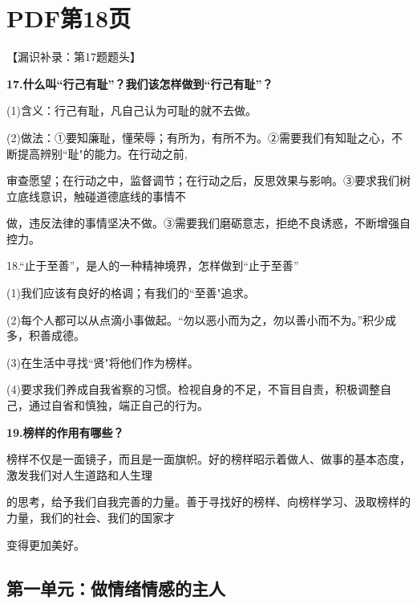 \documentclass[lang=cn,11pt]{elegantbook}
\newcommand{\daofasym}[1]{{\daofasymbolfont #1}}
\newcommand{\daofasym}[1]{#1}
\begin{document}
\section*{PDF第18页}

【漏识补录：第17题题头】\par

\textbf{17.什么叫“行己有耻”？我们该怎样做到“行己有耻”？}\par

(1)含义：行己有耻，凡自己认为可耻的就不去做。\par

(2)做法：\daofasym{①}要知廉耻，懂荣辱；有所为，有所不为。\daofasym{②}需要我们有知耻之心，不断提高辨别“耻"的能力。在行动之前,\par

审查愿望；在行动之中，监督调节；在行动之后，反思效果与影响。\daofasym{③}要求我们树立底线意识，触碰道德底线的事情不\par

做，违反法律的事情坚决不做。\daofasym{③}需要我们磨砺意志，拒绝不良诱惑，不断增强自控力。\par

18.“止于至善”，是人的一种精神境界，怎样做到“止于至善”\par

(1)我们应该有良好的格调；有我们的“至善"追求。\par

(2)每个人都可以从点滴小事做起。“勿以恶小而为之，勿以善小而不为。”积少成多，积善成德。\par

(3)在生活中寻找“贤"将他们作为榜样。\par

(4)要求我们养成自我省察的习惯。检视自身的不足，不盲目自责，积极调整自己，通过自省和慎独，端正自己的行为。\par

\textbf{19.榜样的作用有哪些？}\par

榜样不仅是一面镜子，而且是一面旗帜。好的榜样昭示着做人、做事的基本态度，激发我们对人生道路和人生理\par

的思考，给予我们自我完善的力量。善于寻找好的榜样、向榜样学习、汲取榜样的力量，我们的社会、我们的国家才\par

变得更加美好。\par

\subsection*{第一单元：做情绪情感的主人}
\end{document}
